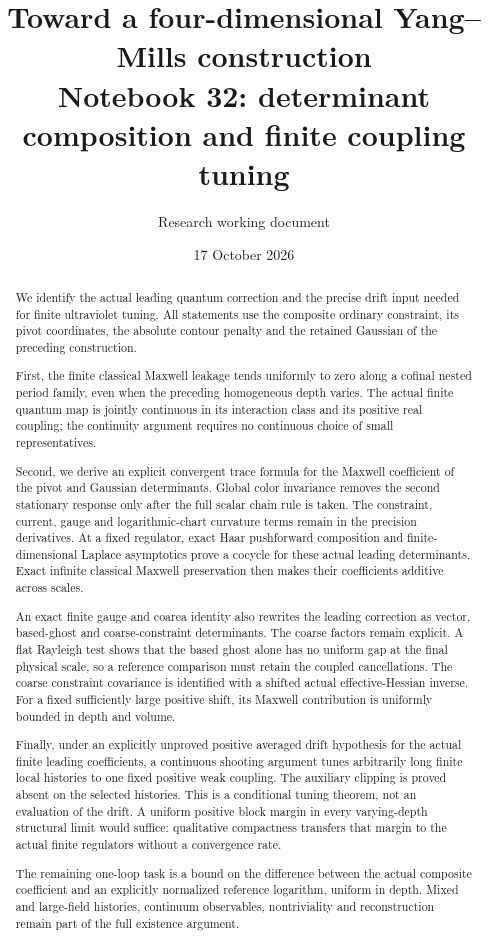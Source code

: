 \documentclass[11pt]{article}
\title{Toward a four-dimensional Yang--Mills construction\\
\large Notebook 32: determinant composition and finite coupling tuning}
\author{Research working document}
\date{17 October 2026}
\theoremstyle{remark}
\begin{document}
\maketitle
\begin{abstract}
We identify the actual leading quantum correction and the precise
drift input needed for finite ultraviolet tuning. All statements
use the composite ordinary constraint, its pivot coordinates,
the absolute contour penalty and the retained Gaussian of the
preceding construction.

First, the finite classical Maxwell leakage tends uniformly to
zero along a cofinal nested period family, even when the preceding
homogeneous depth varies. The actual finite quantum map is jointly
continuous in its interaction class and its positive real coupling;
the continuity argument requires no continuous choice of small
representatives.

Second, we derive an explicit convergent trace formula for the
Maxwell coefficient of the pivot and Gaussian determinants.
Global color invariance removes the second stationary response
only after the full scalar chain rule is taken. The constraint,
current, gauge and logarithmic-chart curvature terms remain in
the precision derivatives. At a fixed regulator, exact Haar
pushforward composition and finite-dimensional Laplace asymptotics
prove a cocycle for these actual leading determinants. Exact
infinite classical Maxwell preservation then makes their
coefficients additive across scales.

An exact finite gauge and coarea identity also rewrites the
leading correction as vector, based-ghost and coarse-constraint
determinants. The coarse factors remain explicit. A flat
Rayleigh test shows that the based ghost alone has no uniform
gap at the final physical scale, so a reference comparison
must retain the coupled cancellations. The coarse constraint
covariance is identified with a shifted actual effective-Hessian
inverse. For a fixed sufficiently large positive shift, its
Maxwell contribution is uniformly bounded in depth and volume.

Finally, under an explicitly unproved positive averaged drift
hypothesis for the actual finite leading coefficients, a continuous
shooting argument tunes arbitrarily long finite local histories
to one fixed positive weak coupling. The auxiliary clipping is
proved absent on the selected histories. This is a conditional
tuning theorem, not an evaluation of the drift. A uniform positive
block margin in every varying-depth structural limit would suffice:
qualitative compactness transfers that margin to the actual finite
regulators without a convergence rate.

The remaining one-loop task is a bound on the difference between
the actual composite coefficient and an explicitly normalized
reference logarithm, uniform in depth. Mixed and large-field
histories, continuum observables, nontriviality and reconstruction
remain part of the full existence argument.
\end{abstract}
\end{document}
